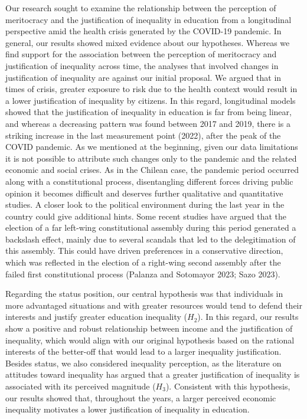 \documentclass[
]{article}
\begin{document}
Our research sought to examine the relationship between the perception
of meritocracy and the justification of inequality in education from a
longitudinal perspective amid the health crisis generated by the
COVID-19 pandemic. In general, our results showed mixed evidence about
our hypotheses. Whereas we find support for the association between the
perception of meritocracy and justification of inequality across time,
the analyses that involved changes in justification of inequality are
against our initial proposal. We argued that in times of crisis, greater
exposure to risk due to the health context would result in a lower
justification of inequality by citizens. In this regard, longitudinal
models showed that the justification of inequality in education is far
from being linear, and whereas a decreasing pattern was found between
2017 and 2019, there is a striking increase in the last measurement
point (2022), after the peak of the COVID pandemic. As we mentioned at
the beginning, given our data limitations it is not possible to
attribute such changes only to the pandemic and the related economic and
social crises. As in the Chilean case, the pandemic period occurred
along with a constitutional process, disentangling different forces
driving public opinion it becomes difficult and deserves further
qualitative and quantitative studies. A closer look to the political
environment during the last year in the country could give additional
hints. Some recent studies have argued that the election of a far
left-wing constitutional assembly during this period generated a
backslash effect, mainly due to several scandals that led to the
delegitimation of this assembly. This could have driven preferences in a
conservative direction, which was reflected in the election of a
right-wing second assembly after the failed first constitutional process
(Palanza and Sotomayor 2023; Sazo 2023).

Regarding the status position, our central hypothesis was that
individuals in more advantaged situations and with greater resources
would tend to defend their interests and justify greater education
inequality (\(H_2\)). In this regard, our results show a positive and
robust relationship between income and the justification of inequality,
which would align with our original hypothesis based on the rational
interests of the better-off that would lead to a larger inequality
justification. Besides status, we also considered inequality perception,
as the literature on attitudes toward inequality has argued that a
greater justification of inequality is associated with its perceived
magnitude (\(H_3\)). Consistent with this hypothesis, our results showed
that, throughout the years, a larger perceived economic inequality
motivates a lower justification of inequality in education.
\end{document}
